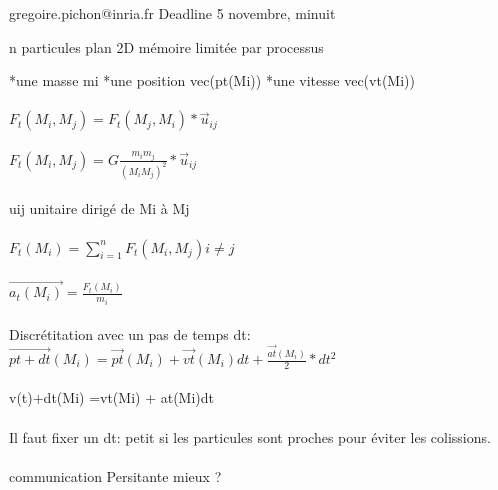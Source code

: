 \documentclass{article}
\begin{document}
gregoire.pichon@inria.fr
Deadline 5 novembre, minuit

n particules plan 2D
mémoire limitée par processus

*une masse mi
*une position vec(pt(Mi)) 
*une vitesse vec(vt(Mi))

\paragraph{}
$ F_t(M_i, M_j) = F_t(M_j, M_i) * \overrightarrow{u}_{ij} $
\paragraph{}
$ F_t(M_i, M_j) = G \frac{m_i m_j}{(M_i M_j)^2} * \overrightarrow{u}_{ij} $
\paragraph{}
uij unitaire dirigé de Mi à Mj
\paragraph{}
$ F_t(M_i) = \sum_{i=1}^{n}  F_t(M_i, M_j) i \not= j $
\paragraph{}
$ \overrightarrow{a_t(M_i)} = \frac{F_t(M_i)}{m_i} $
\paragraph{}
Discrétitation avec un pas de temps dt: 
$ \overrightarrow{pt+dt}(M_i) = \overrightarrow{pt}(M_i) + \overrightarrow{vt}(M_i)dt + \frac{\overrightarrow{at}(M_i)}{2} * dt^2 $
\paragraph{}
v(t)+dt(Mi)  =vt(Mi) + at(Mi)dt
\paragraph{}
Il faut fixer un dt: petit si les particules sont proches pour éviter les colissions.
\paragraph{}

\paragraph{}


communication Persitante mieux ?
\end{document}
